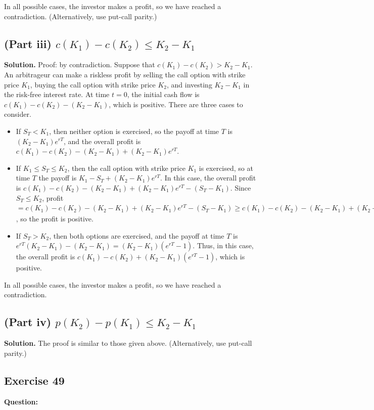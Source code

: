 \documentclass{article}
\begin{document}
In all possible cases, the investor makes a profit, so we have reached a contradiction. (Alternatively, use put-call parity.)

\subsection*{(Part iii) $c(K_1) - c(K_2) \leq K_2 - K_1$}
\textbf{Solution.} Proof: by contradiction. Suppose that $c(K_1) - c(K_2) > K_2 - K_1$. An arbitrageur can make a riskless profit by selling the call option with strike price $K_1$, buying the call option with strike price $K_2$, and investing $K_2 - K_1$ in the risk-free interest rate. At time $t = 0$, the initial cash flow is $c(K_1) - c(K_2) - (K_2 - K_1)$, which is positive. There are three cases to consider.
\begin{itemize}
    \item If $S_T < K_1$, then neither option is exercised, so the payoff at time $T$ is $(K_2 - K_1)e^{rT}$, and the overall profit is $c(K_1) - c(K_2) - (K_2 - K_1) + (K_2 - K_1)e^{rT}$.
    \item If $K_1 \leq S_T \leq K_2$, then the call option with strike price $K_1$ is exercised, so at time $T$ the payoff is $K_1 - S_T + (K_2 - K_1)e^{rT}$. In this case, the overall profit is $c(K_1) - c(K_2) - (K_2 - K_1) + (K_2 - K_1)e^{rT} - (S_T - K_1)$. Since $S_T \leq K_2$, profit $= c(K_1) - c(K_2) - (K_2 - K_1) + (K_2 - K_1)e^{rT} - (S_T - K_1) \geq c(K_1) - c(K_2) - (K_2 - K_1) + (K_2 - K_1)e^{rT} - (K_2 - K_1) = c(K_1) - c(K_2) + (K_2 - K_1)(e^{rT} - 1)$, so the profit is positive.
    \item If $S_T > K_2$, then both options are exercised, and the payoff at time $T$ is $e^{rT}(K_2 - K_1) - (K_2 - K_1) = (K_2 - K_1)(e^{rT} - 1)$. Thus, in this case, the overall profit is $c(K_1) - c(K_2) + (K_2 - K_1)(e^{rT} - 1)$, which is positive.
\end{itemize}
In all possible cases, the investor makes a profit, so we have reached a contradiction.

\subsection*{(Part iv) $p(K_2) - p(K_1) \leq K_2 - K_1$}
\textbf{Solution.} The proof is similar to those given above. (Alternatively, use put-call parity.)

\newpage

\subsection*{Exercise 49}
\textbf{Question:} 
\end{document}
